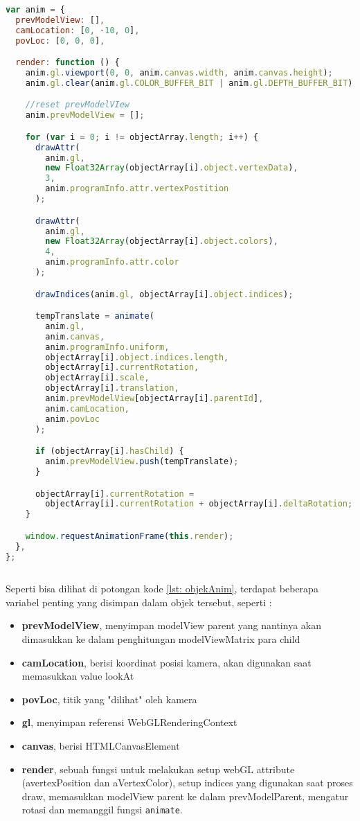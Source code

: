 \begin{lstlisting}[language=javascript, label={lst: objekAnim}, caption={objek anim}]
var anim = {
  prevModelView: [],
  camLocation: [0, -10, 0],
  povLoc: [0, 0, 0],

  render: function () {
    anim.gl.viewport(0, 0, anim.canvas.width, anim.canvas.height);
    anim.gl.clear(anim.gl.COLOR_BUFFER_BIT | anim.gl.DEPTH_BUFFER_BIT);

    //reset prevModelVIew
    anim.prevModelView = [];

    for (var i = 0; i != objectArray.length; i++) {
      drawAttr(
        anim.gl,
        new Float32Array(objectArray[i].object.vertexData),
        3,
        anim.programInfo.attr.vertexPostition
      );

      drawAttr(
        anim.gl,
        new Float32Array(objectArray[i].object.colors),
        4,
        anim.programInfo.attr.color
      );

      drawIndices(anim.gl, objectArray[i].object.indices);

      tempTranslate = animate(
        anim.gl,
        anim.canvas,
        anim.programInfo.uniform,
        objectArray[i].object.indices.length,
        objectArray[i].currentRotation,
        objectArray[i].scale,
        objectArray[i].translation,
        anim.prevModelView[objectArray[i].parentId],
        anim.camLocation,
        anim.povLoc
      );

      if (objectArray[i].hasChild) {
        anim.prevModelView.push(tempTranslate);
      }

      objectArray[i].currentRotation =
        objectArray[i].currentRotation + objectArray[i].deltaRotation;
    }

    window.requestAnimationFrame(this.render);
  },
};
  
\end{lstlisting}

Seperti bisa dilihat di potongan kode \ref{lst: objekAnim}, terdapat beberapa variabel penting yang disimpan dalam objek tersebut, seperti :

\begin{itemize}
  \item  \textbf{prevModelView}, menyimpan modelView parent yang nantinya akan dimasukkan ke dalam penghitungan modelViewMatrix para child
  \item \textbf{camLocation}, berisi koordinat posisi kamera, akan digunakan saat memasukkan value lookAt
  \item \textbf{povLoc}, titik yang "dilihat" oleh kamera
  \item \textbf{gl}, menyimpan referensi WebGLRenderingContext
  \item \textbf{canvas}, berisi HTMLCanvasElement
  \item \textbf{render}, sebuah fungsi untuk melakukan setup webGL attribute (avertexPosition dan aVertexColor), setup indices yang digunakan saat proses draw, memasukkan modelView parent ke dalam prevModelParent, mengatur rotasi dan memanggil fungsi \texttt{animate}.
\end{itemize}


